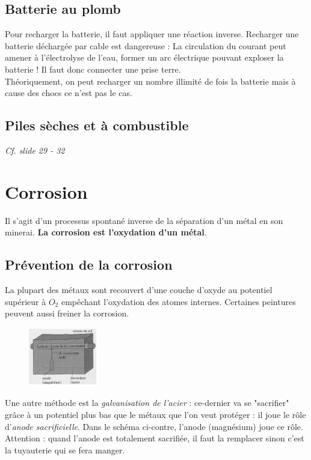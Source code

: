 \documentclass	[11pt, a4paper, openany]{book}
\begin{document}
\subsection*{Batterie au plomb}
Pour recharger la batterie, il faut appliquer une réaction inverse. Recharger une batterie déchargée par cable est dangereuse : La circulation du courant peut amener à l'électrolyse de l'eau, former un arc électrique pouvant exploser la batterie ! Il faut donc connecter une prise terre.\\
Théoriquement, on peut recharger un nombre illimité de fois la batterie mais à cause des chocs ce n'est pas le cas.

\subsection*{Piles sèches et à combustible}
\textit{Cf. slide 29 - 32}

\section{Corrosion}
Il s'agit d'un processus spontané inverse de la séparation d'un métal en son minerai. \textbf{La corrosion est l'oxydation d'un métal}.

\subsection*{Prévention de la corrosion}
La plupart des métaux sont recouvert d'une couche d'oxyde au potentiel supérieur à $O_2$ empêchant l'oxydation des atomes internes. Certaines peintures peuvent aussi freiner la corrosion.\\

\begin{figure}
	\includegraphics[width=3cm]{image4.png}
\end{figure}
Une autre méthode est la \textit{galvanisation de l'acier} : ce-dernier va  se "sacrifier" grâce à un potentiel plus bas que le métaux que l'on veut protéger : il joue le rôle d'\textit{anode sacrificielle}. Dans le schéma ci-contre, l'anode (magnésium) joue ce rôle. Attention : quand l'anode est totalement sacrifiée, il faut la remplacer sinon c'est la tuyauterie qui se fera manger.
\end{document}
